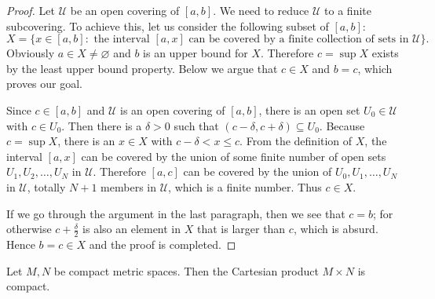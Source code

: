 \begin{proof}
  Let $\mathcal{U}$ be an open covering of $[a,b]$.
  We need to reduce $\mathcal{U}$ to a finite subcovering.
  To achieve this, let us consider the following subset of $[a,b]$:
  \[
    X = \{ x \in [a,b] \colon \text{ the interval $[a,x]$ can be covered by a finite collection of sets in $\mathcal{U}$} \}.
  \]
  Obviously $a \in X \ne \varnothing$ and $b$ is an upper bound for $X$.
  Therefore $c = \sup X$ exists by the least upper bound property.
  Below we argue that $c \in X$ and $b = c$, which proves our goal.

  Since $c \in [a,b]$ and $\mathcal{U}$ is an open covering of $[a,b]$, there is an open set $U_0 \in \mathcal{U}$ with $c \in U_0$.
  Then there is a $\delta > 0$ such that $(c - \delta, c + \delta) \subseteq U_0$.
  Because $c = \sup X$, there is an $x \in X$ with $c - \delta < x \leqslant c$.
  From the definition of $X$, the interval $[a,x]$ can be covered by the union of some finite number of open sets $U_1, U_2, \dots, U_N$ in $\mathcal{U}$.
  Therefore $[a,c]$ can be covered by the union of $U_0, U_1, \dots, U_N$ in $\mathcal{U}$, totally $N+1$ members in $\mathcal{U}$, which is a finite number.  Thus $c \in X$.

  If we go through the argument in the last paragraph, then we see that $c = b$; for otherwise $c + \frac{\delta}{2}$ is also an element in $X$ that is larger than $c$, which is absurd.
  Hence $b = c \in X$ and the proof is completed.
\end{proof}

\begin{thm}
  \label{thm:tube}
  Let $M, N$ be compact metric spaces.
  Then the Cartesian product $M \times N$ is compact.
\end{thm}

